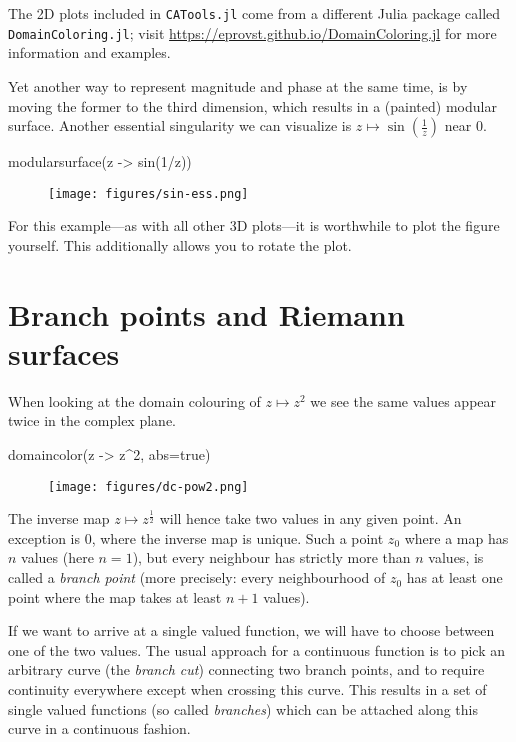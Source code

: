 \documentclass[a4paper]{article}
\begin{document}
The 2D plots included in \texttt{CATools.jl} come from a different Julia package
called \texttt{DomainColoring.jl}; visit
\url{https://eprovst.github.io/DomainColoring.jl} for more information and
examples.

Yet another way to represent magnitude and phase at the same time, is by moving
the former to the third dimension, which results in a (painted) modular surface.
Another essential singularity we can visualize is
$z \mapsto \sin\left(\frac{1}{z}\right)$ near $0$.

\begin{juliaverbatim}
	modularsurface(z -> sin(1/z))
\end{juliaverbatim}
\begin{figure}[H]
	\centering
	\texttt{[image: figures/sin-ess.png]}
\end{figure}

For this example---as with all other 3D plots---it is worthwhile to plot the
figure yourself. This additionally allows you to rotate the plot.

\section{Branch points and Riemann surfaces}

When looking at the domain colouring of $z \mapsto z^2$ we see the same values
appear twice in the complex plane.

\begin{juliaverbatim}
	domaincolor(z -> z^2, abs=true)
\end{juliaverbatim}
\begin{figure}[H]
	\centering
	\texttt{[image: figures/dc-pow2.png]}
\end{figure}

The inverse map $z \mapsto z^{\frac{1}{2}}$ will hence take two values in any
given point. An exception is $0$, where the inverse map is unique. Such a point
$z_0$ where a map has $n$ values (here $n=1$), but every neighbour has strictly
more than $n$ values, is called a \emph{branch point} (more precisely: every
neighbourhood of $z_0$ has at least one point where the map takes at least $n+1$
values).

If we want to arrive at a single valued function, we will have to choose between
one of the two values. The usual approach for a continuous function is to pick
an arbitrary curve (the \emph{branch cut}) connecting two branch points, and to
require continuity everywhere except when crossing this curve. This results in a
set of single valued functions (so called \emph{branches}) which can be attached
along this curve in a continuous fashion.
\end{document}
